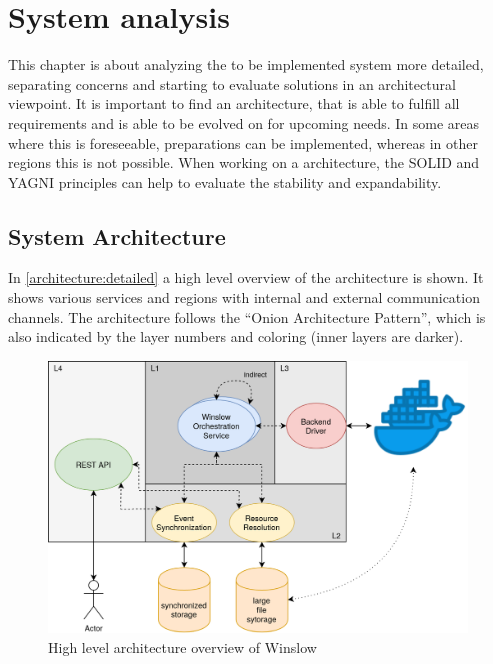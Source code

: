 
\chapter{System analysis}

This chapter is about analyzing the to be implemented system more detailed, separating concerns and starting to evaluate solutions in an architectural viewpoint.
It is important to find an architecture, that is able to fulfill all requirements and is able to be evolved on for upcoming needs.
In some areas where this is foreseeable, preparations can be implemented, whereas in other regions this is not possible.
When working on a architecture, the SOLID and YAGNI principles can help to evaluate the stability and expandability.



\pagebreak
\section{System Architecture}

In \autoref{architecture:detailed} a high level overview of the architecture is shown.
It shows various services and regions with internal and external communication channels.
The architecture follows the \enquote{Onion Architecture Pattern}, which is also indicated by the layer numbers and coloring (inner layers are darker).


\begin{figure}[H]
	\includegraphics[width=0.99\textwidth]{architecture_detailed.png}
	\centering
	\caption{High level architecture overview of Winslow}
	\label{architecture:detailed}
\end{figure}

